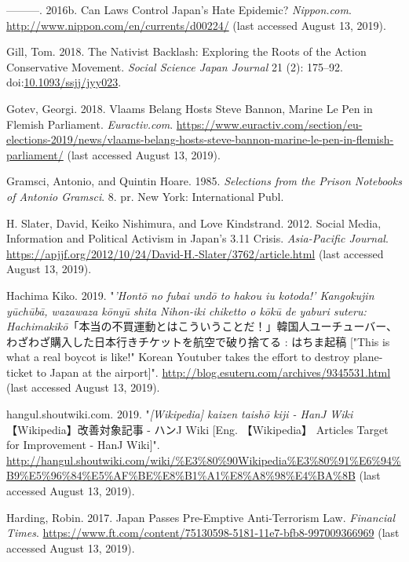 \documentclass[10pt,british,A4paper,twoside]{memoir}
\begin{document}
\hypertarget{ref-furuya_can_2016}{}
---------. 2016b. Can Laws Control Japan's Hate Epidemic?
\emph{Nippon.com}. \url{http://www.nippon.com/en/currents/d00224/} (last accessed August 13, 2019).

\hypertarget{ref-gill_nativist_2018}{}
Gill, Tom. 2018. The Nativist Backlash: Exploring the Roots of the
Action Conservative Movement. \emph{Social Science Japan Journal} 21
(2): 175--92.
doi:\href{https://doi.org/10.1093/ssjj/jyy023}{10.1093/ssjj/jyy023}.

\hypertarget{ref-gotev_vlaams_2018}{}
Gotev, Georgi. 2018. Vlaams Belang Hosts Steve Bannon, Marine Le Pen in
Flemish Parliament. \emph{Euractiv.com}.
\url{https://www.euractiv.com/section/eu-elections-2019/news/vlaams-belang-hosts-steve-bannon-marine-le-pen-in-flemish-parliament/} (last accessed August 13, 2019).

\hypertarget{ref-gramsci_selections_1985}{}
Gramsci, Antonio, and Quintin Hoare. 1985. \emph{Selections from the
Prison Notebooks of Antonio Gramsci}. 8. pr. New York: International
Publ.

\hypertarget{ref-h._slater_social_2012}{}
H. Slater, David, Keiko Nishimura, and Love Kindstrand. 2012. Social
Media, Information and Political Activism in Japan's 3.11 Crisis.
\emph{Asia-Pacific Journal}.
\url{https://apjjf.org/2012/10/24/David-H.-Slater/3762/article.html} (last accessed August 13, 2019).

\hypertarget{ref-hachima_kiko_eng:_2019}{}
Hachima Kiko. 2019. "\emph{'Hontō no fubai undō to hakou iu kotoda!' Kangokujin yūchūbā, wazawaza kōnyū shita Nihon-iki chiketto o kōkū de yaburi suteru: Hachimakikō}「本当の不買運動とはこういうことだ！」韓国人ユーチューバー、わざわざ購入した日本行きチケットを航空で破り捨てる : はちま起稿 ["This is what a real boycot is like!" Korean Youtuber takes the effort to destroy plane-ticket to Japan at the airport]". \url{http://blog.esuteru.com/archives/9345531.html} (last accessed August 13, 2019).

\hypertarget{ref-hangul.shoutwiki.com_wikipedia_2019}{}
hangul.shoutwiki.com. 2019. "\emph{[Wikipedia] kaizen taishō kiji - HanJ Wiki} 【Wikipedia】改善対象記事 - ハンJ Wiki [Eng. 【Wikipedia】 Articles Target for Improvement - HanJ Wiki]".
\url{http://hangul.shoutwiki.com/wiki/\%E3\%80\%90Wikipedia\%E3\%80\%91\%E6\%94\%B9\%E5\%96\%84\%E5\%AF\%BE\%E8\%B1\%A1\%E8\%A8\%98\%E4\%BA\%8B} (last accessed August 13, 2019).

\hypertarget{ref-harding_japan_2017}{}
Harding, Robin. 2017. Japan Passes Pre-Emptive Anti-Terrorism Law.
\emph{Financial Times}.
\url{https://www.ft.com/content/75130598-5181-11e7-bfb8-997009366969} (last accessed August 13, 2019).
\end{document}
